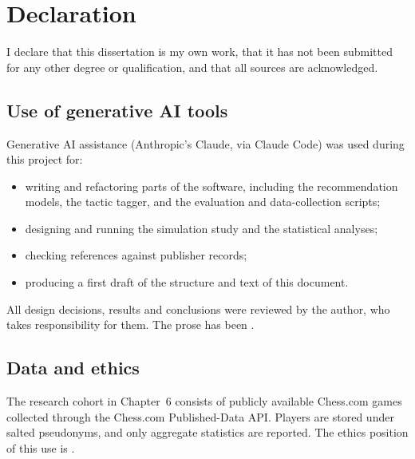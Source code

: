 \chapter*{Declaration}


I declare that this dissertation is my own work, that it has not been submitted for any other
degree or qualification, and that all sources are acknowledged.

\section*{Use of generative AI tools}


Generative AI assistance (Anthropic's Claude, via Claude Code) was used during this project for:
\begin{itemize}
  \item writing and refactoring parts of the software, including the recommendation models, the
        tactic tagger, and the evaluation and data-collection scripts;
  \item designing and running the simulation study and the statistical analyses;
  \item checking references against publisher records;
  \item producing a first draft of the structure and text of this document.
\end{itemize}
All design decisions, results and conclusions were reviewed by the author, who takes
responsibility for them. The prose has been .

\section*{Data and ethics}

The research cohort in Chapter~6 consists of publicly available Chess.com games collected through the
Chess.com Published-Data API. Players are stored under salted pseudonyms, and only aggregate
statistics are reported. The ethics position of this use is .
